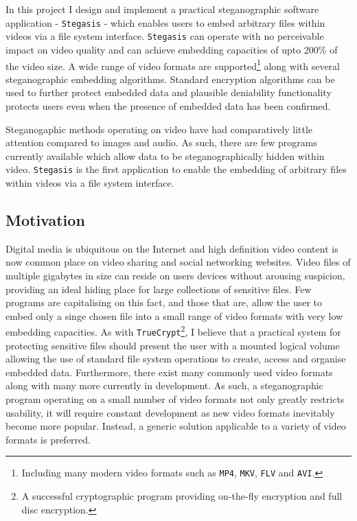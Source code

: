 \documentclass[paper=a4, fontsize=11pt,twoside]{scrartcl}    %
\numberwithin{table}{section}
\numberwithin{figure}{section}
\numberwithin{algorithm}{section}
\begin{document}
In this project I design and implement a practical steganographic software application - \texttt{Stegasis} - which enables users to embed arbitrary files within videos via a file system interface. \texttt{Stegasis} can operate with no perceivable impact on video quality and can achieve embedding capacities of upto 200\% of the video size. A wide range of video formats are supported\footnote{Including many modern video formats such as \texttt{MP4}, \texttt{MKV}, \texttt{FLV} and \texttt{AVI}.} along with several steganographic embedding algorithms. Standard encryption algorithms can be used to further protect embedded data and plausible deniability functionality protects users even when the presence of embedded data has been confirmed.

Steganogaphic methods operating on video have had comparatively little attention compared to images and audio. As such, there are few programs currently available which allow data to be steganographically hidden within video. \texttt{Stegasis} is the first application to enable the embedding of arbitrary files within videos via a file system interface.   



\subsection{Motivation}
Digital media is ubiquitous on the Internet and high definition video content is now common place on video sharing and social networking websites. Video files of multiple gigabytes in size can reside on users devices without arousing suspicion, providing an ideal hiding place for large collections of sensitive files. Few programs are capitalising on this fact, and those that are, allow the user to embed only a singe chosen file into a small range of video formats with very low embedding capacities. As with \texttt{TrueCrypt}\footnote{A successful cryptographic program providing on-the-fly encryption and full disc encryption.}, I believe that a practical system for protecting sensitive files should present the user with a mounted logical volume allowing the use of standard file system operations to create, access and organise embedded data. Furthermore, there exist many commonly used video formats along with many more currently in development. As such, a steganographic program operating on a small number of video formats not only greatly restricts usability, it will require constant development as new video formats inevitably become more popular. Instead, a generic solution applicable to a variety of video formats is preferred.
\end{document}
